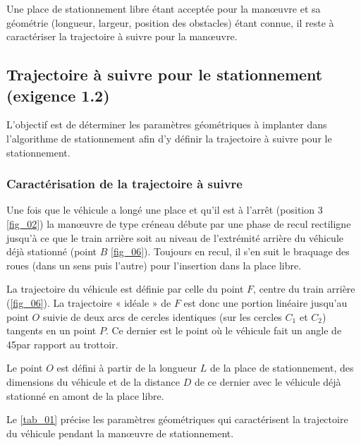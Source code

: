 Une place de stationnement libre étant acceptée pour la manœuvre et sa géométrie (longueur, largeur, position
des obstacles) étant connue, il reste à caractériser la trajectoire à suivre pour la manœuvre.

\subsection{Trajectoire à suivre pour le stationnement (exigence 1.2)}

\begin{obj}
L’objectif est de déterminer les paramètres géométriques à implanter dans l’algorithme de stationnement afin d’y définir la trajectoire à suivre pour le stationnement.
\end{obj}

\subsubsection{Caractérisation de la trajectoire à suivre}
Une fois que le véhicule a longé une place et qu’il est à l’arrêt (position 3 \autoref{fig_02}) la manœuvre de type créneau
débute par une phase de recul rectiligne jusqu’à ce que le train arrière soit au niveau de l’extrémité arrière du
véhicule déjà stationné (point $B$ \autoref{fig_06}). Toujours en recul, il s’en suit le braquage des roues (dans un sens
puis l’autre) pour l’insertion dans la place libre.

La trajectoire du véhicule est définie par celle du point $F$, centre du train arrière (\autoref{fig_06}). La trajectoire
« idéale » de $F$ est donc une portion linéaire jusqu’au point $O$ suivie de deux arcs de cercles identiques (sur les cercles $C_1$ et $C_2$) tangents en un point $P$. Ce dernier est le point où le véhicule fait un angle de 45\degres par rapport
au trottoir.

Le point $O$ est défini à partir de la longueur $L$  de la place de stationnement, des dimensions du véhicule et de
la distance $D$ de ce dernier avec le véhicule déjà stationné en amont de la place libre.

Le \autoref{tab_01} précise les paramètres géométriques qui caractérisent la trajectoire du véhicule pendant la manœuvre de stationnement.


